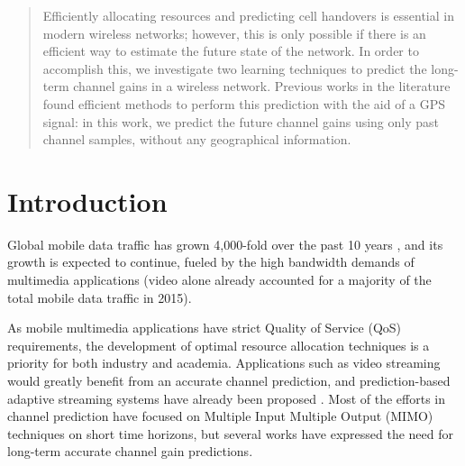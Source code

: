\documentclass[conference, a4paper]{IEEEtran}
\begin{document}
\maketitle

\begin{abstract}
Efficiently allocating resources and predicting cell handovers is essential in modern wireless networks; however, this is only possible if there is an efficient way to estimate the future state of the network.
In order to accomplish this, we investigate two learning techniques to predict the long-term channel gains in a wireless network. Previous works in the literature found efficient methods to perform this prediction with the aid of a GPS signal: in this work, we predict the future channel gains using only past channel samples, without any geographical information.
\end{abstract}





%
\IEEEpeerreviewmaketitle



\section{Introduction}
Global mobile data traffic has grown 4,000-fold over the past 10 years \cite{cisco2016global}, and its growth is expected to continue, fueled by the high bandwidth demands of multimedia applications (video alone already accounted for a majority of the total mobile data traffic in 2015).

As mobile multimedia applications have strict Quality of Service (QoS) requirements, the development of optimal resource allocation techniques is a priority for both industry and academia. Applications such as video streaming would greatly benefit from an accurate channel prediction, and prediction-based adaptive streaming systems have already been proposed \cite{mekki2015anticipatory}. Most of the efforts in channel prediction have focused on Multiple Input Multiple Output (MIMO) techniques on short time horizons, but several works \cite{zhou2004accurate} \cite{liao2015channel} have expressed the need for long-term accurate channel gain predictions. 
\end{document}
